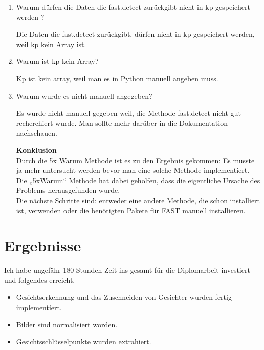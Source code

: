 \begin{flushleft}
\begin{enumerate}
	\item	Warum dürfen die Daten die fast.detect zurückgibt nicht in kp gespeichert
	werden ? 
	
	Die Daten die fast.detect zurückgibt, dürfen nicht in kp gespeichert werden, weil
	kp kein Array ist. 
	
	\item	Warum ist kp kein Array? 
	
	Kp ist kein array, weil man es in Python  manuell angeben muss.
	
	\item Warum wurde es nicht manuell angegeben? 
	
	Es wurde nicht manuell gegeben weil, die Methode fast.detect nicht gut
	recherchiert wurde. Man sollte mehr darüber in die Dokumentation nachschauen.
	
	\textbf{Konklusion}\\
	Durch die 5x Warum Methode ist es zu den Ergebnis gekommen: Es musste ja mehr
	untersucht werden bevor man eine solche Methode implementiert. Die „5xWarum“
	Methode hat dabei geholfen, dass die eigentliche Ursache des Problems
	herausgefunden wurde.\\
	Die nächste Schritte sind: entweder eine andere Methode, die schon installiert
	ist, verwenden oder die benötigten Pakete für FAST manuell installieren. 
	
	
	
\end{enumerate}

\end{flushleft}

\section{Ergebnisse}

\begin{flushleft}
	
Ich habe ungefähr 180 Stunden Zeit ins gesamt für die Diplomarbeit investiert und folgendes erreicht.\\

\begin{itemize}
	\item Gesichtserkennung und das Zuschneiden von Gesichter wurden fertig
	implementiert.
	\item Bilder sind normalisiert worden.\\
	\item Gesichtsschlüsselpunkte wurden extrahiert.\\
	
\end{itemize}


\end{flushleft}
